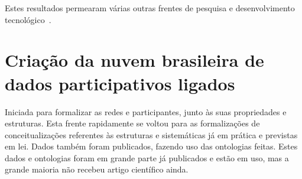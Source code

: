 \documentclass[a4paper,openright,12pt]{report} %
\begin{document}
Estes resultados permearam várias outras frentes 
de pesquisa e desenvolvimento tecnológico~\cite{prod1,prod2,prod3,prod4,prod5,ops,versinus}.

\section{Criação da nuvem brasileira de dados participativos ligados}
Iniciada para formalizar as redes e participantes, junto às suas
propriedades e estruturas.
Esta frente rapidamente se voltou para
as formalizações de conceitualizações referentes às estruturas
e sistemáticas já em prática e previstas em lei.
Dados também foram publicados, fazendo uso das ontologias
feitas. Estes dados e ontologias foram em grande parte
já publicados e estão em uso, mas a grande maioria não
recebeu artigo científico ainda.
\end{document}
